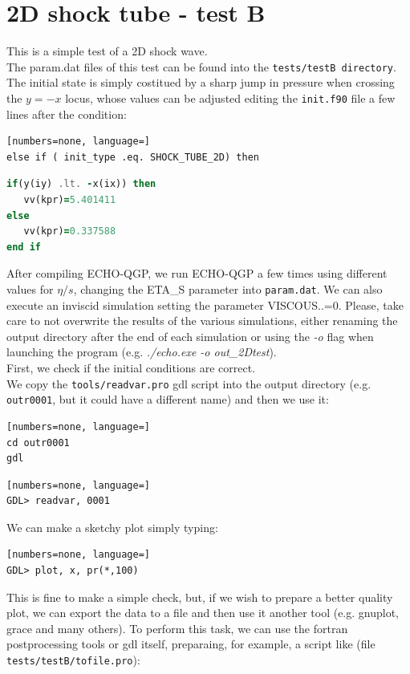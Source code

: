 \section{2D shock tube - test B}
This is a simple test of a 2D shock wave.\\
The param.dat files of this test can be found into the {\tt tests/testB directory}.\\
The initial state is simply costitued by a sharp jump in pressure when crossing the $y=-x$ locus, whose values can be adjusted editing the {\tt init.f90} file a few lines after the condition:
\begin{lstlisting}[numbers=none, language=]
else if ( init_type .eq. SHOCK_TUBE_2D) then
\end{lstlisting}
\begin{lstlisting}[numbers=none, language=Fortran]
if(y(iy) .lt. -x(ix)) then
   vv(kpr)=5.401411
else
   vv(kpr)=0.337588
end if
\end{lstlisting}
After compiling ECHO-QGP, we run ECHO-QGP a few times using different values for $\eta/s$, changing the ETA\_S parameter into {\tt param.dat}. We can also execute an inviscid simulation setting the parameter VISCOUS..=0. Please, take care to not overwrite the results of the various simulations, either renaming the output directory after the end of each simulation or using the \emph{-o} flag when launching the program (e.g. \emph{./echo.exe -o out\_2Dtest}).\\
First, we check if the initial conditions are correct.\\
We copy the {\tt tools/readvar.pro} gdl script into the output directory (e.g. {\tt outr0001}, but it could have a different name) and then we use it:\\
\begin{lstlisting}[numbers=none, language=]
cd outr0001
gdl
\end{lstlisting}
\begin{lstlisting}[numbers=none, language=]
GDL> readvar, 0001
\end{lstlisting}
We can make a sketchy plot simply typing:
\begin{lstlisting}[numbers=none, language=]
GDL> plot, x, pr(*,100)
\end{lstlisting}
This is fine to make a simple check, but, if we wish to prepare a better quality plot, we can export the data to a file and then use it another tool (e.g. gnuplot, grace and many others). To perform this task, we can use the fortran postprocessing tools or gdl itself, preparaing, for example, a script like (file {\tt tests/testB/tofile.pro}):

